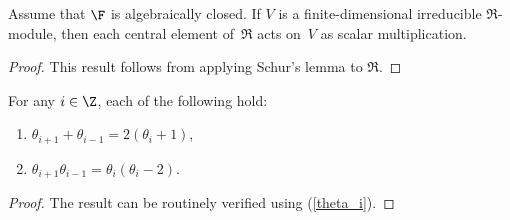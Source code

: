 \begin{Lemma}\label{lem:Schur}Assume that $\F$ is algebraically closed. If $V$ is a finite-dimensional irreducible $\Re$-module, then each central element of~$\Re$ acts on~$V$ as scalar multiplication.
\end{Lemma}
\begin{proof}This result follows from applying Schur's lemma to $\Re$.
\end{proof}

\begin{Lemma}\label{lem:theta}For any $i\in \Z$, each of the following hold:
\begin{enumerate}\itemsep=0pt
\item[$(i)$] $\theta_{i+1}+\theta_{i-1}=2(\theta_i+1)$,
\item[$(ii)$] $\theta_{i+1}\theta_{i-1}=\theta_i(\theta_i-2)$.
\end{enumerate}
\end{Lemma}
\begin{proof}The result can be routinely verified using (\ref{theta_i}).
\end{proof}

